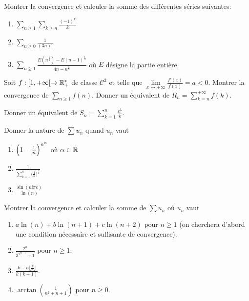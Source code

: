 \begin{exercise}
	Montrer la convergence et calculer la somme des différentes séries suivantes:
	\begin{enumerate}
		\item
		$\sum_{n\geqslant1}\sum_{k\geqslant n}\frac{(-1)^{k}}{k}$
		\item
		$\sum_{n\geqslant0}\frac{1}{(3n)!}$
		\item
		$\sum_{n\geqslant1}\frac{E(n^{\frac{1}{3}})-E(n-1)^{\frac{1}{3}}}{4n-n^{\frac{1}{3}}}$
		où $E$ désigne la partie entière.
	\end{enumerate}
\end{exercise}

\begin{exercise}
	Soit $f:[1,+\infty[\to\mathbb{R}_{+}^{*}$ de classe $\mathcal{C}^{2}$ et telle que
	$\lim\limits_{x\to+\infty}\frac{f'(x)}{f(x)}=a<0$. Montrer la convergence de
	$\sum_{n\geqslant1}f(n)$. Donner un équivalent de $R_{n}=\sum_{k=n}^{+\infty}
	f(k)$.
\end{exercise}

\begin{exercise}
	Donner un équivalent de $S_{n}=\sum_{k=1}^{n}\frac{e^{k}}{k}$.
\end{exercise}

\begin{exercise}
	Donner la nature de $\sum u_{n}$ quand $u_{n}$ vaut
	\begin{enumerate}
		\item
		$\Bigl(1-\frac{1}{n}\Bigr)^{n^{\alpha}}$ où $\alpha\in\mathbb{R}$
		\item
		$\frac{1}{\sum_{k=1}^{n}\bigl(\frac{1}{k}\bigr)^{\frac{1}{k}}}$
		\item
		$\frac{\sin(n!\pi e)}{\ln(n)}$
	\end{enumerate}
\end{exercise}

\begin{exercise}
	Montrer la convergence et calculer la somme de $\sum u_{n}$ où $u_{n}$ vaut
	\begin{enumerate}
		\item
		$a\ln(n)+b\ln(n+1)+c\ln(n+2)$ pour $n\geqslant1$ (on cherchera d'abord une
		condition nécessaire et suffisante de convergence).
		\item
		$\frac{2^{n}}{3^{2^{n-1}}+1}$ pour $n\geqslant 1$.
		\item
		$\frac{k-n\lfloor\frac{k}{n}\rfloor}{k(k+1)}$.
		\item
		$\arctan(\frac{1}{n^{2}+n+1})$ pour $n\geqslant0$.
	\end{enumerate}
\end{exercise}


